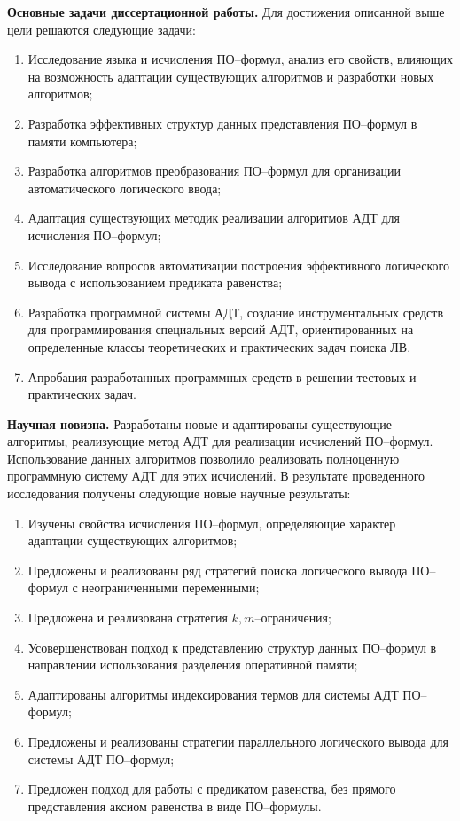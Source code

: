 \documentclass[a4paper]{report}
\begin{document}
\textbf{Основные задачи диссертационной работы.}
Для достижения описанной выше цели решаются следующие задачи:
\begin{enumerate}
\item Исследование языка и исчисления ПО--формул, анализ его свойств, влияющих на возможность адаптации существующих алгоритмов и разработки новых алгоритмов;
\item Разработка эффективных структур данных представления ПО--формул в памяти компьютера;
\item Разработка алгоритмов преобразования ПО--формул для организации автоматического логического ввода;
\item Адаптация существующих методик реализации алгоритмов АДТ для исчисления ПО--формул;
\item Исследование вопросов автоматизации построения эффективного логического вывода с использованием предиката равенства;
\item Разработка программной системы АДТ, создание инструментальных средств для программирования специальных версий АДТ, ориентированных на определенные классы теоретических и практических задач поиска ЛВ.
\item Апробация разработанных программных средств в решении тестовых и практических задач.
\end{enumerate}



\textbf{Научная новизна.} Разработаны новые и адаптированы существующие алгоритмы, реализующие метод АДТ для реализации исчислений ПО--формул. Использование данных алгоритмов позволило реализовать полноценную программную систему АДТ для этих исчислений. В результате проведенного исследования получены следующие новые научные результаты:
\begin{enumerate}
\item Изучены свойства исчисления ПО--формул, определяющие характер адаптации существующих алгоритмов;
\item Предложены и реализованы ряд стратегий поиска логического вывода ПО--формул с неограниченными переменными;
\item Предложена и реализована стратегия $k,m$--ограничения;
\item Усовершенствован подход к представлению структур данных ПО--формул в направлении использования разделения оперативной памяти;
\item Адаптированы алгоритмы индексирования термов для системы АДТ ПО--формул;
\item Предложены и реализованы стратегии параллельного логического вывода для системы АДТ ПО--формул;
\item Предложен подход для работы с предикатом равенства, без прямого представления аксиом равенства в виде ПО--формулы.
\end{enumerate}
\end{document}

